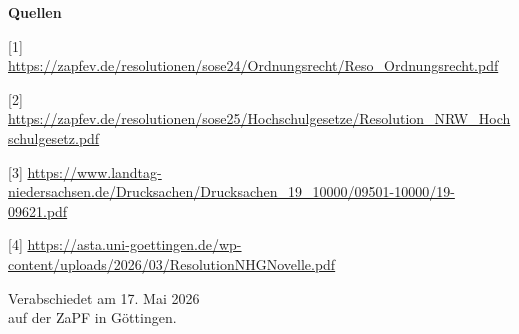 \documentclass[DIV=calc]{scrartcl}
\begin{document}
\textbf{Quellen}

[1] \url{https://zapfev.de/resolutionen/sose24/Ordnungsrecht/Reso\_Ordnungsrecht.pdf}

[2] \url{https://zapfev.de/resolutionen/sose25/Hochschulgesetze/Resolution\_NRW\_Hochschulgesetz.pdf}

[3] \url{https://www.landtag-niedersachsen.de/Drucksachen/Drucksachen\_19\_10000/09501-10000/19-09621.pdf}

[4] \url{https://asta.uni-goettingen.de/wp-content/uploads/2026/03/ResolutionNHGNovelle.pdf}


\vspace{1cm} 
%
\vfill
\begin{flushright}
	Verabschiedet am 17. Mai 2026 \\
	auf der ZaPF in Göttingen.
\end{flushright}
\end{document}
